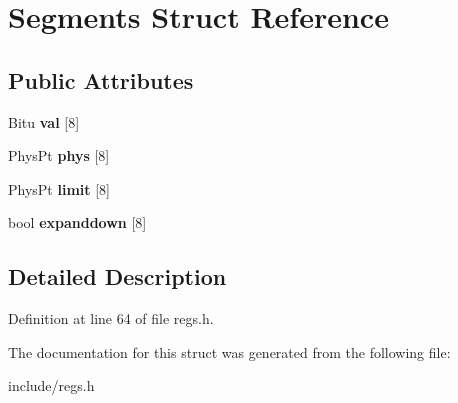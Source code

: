 \hypertarget{structSegments}{\section{Segments Struct Reference}
\label{structSegments}
}
\subsection*{Public Attributes}
\begin{DoxyCompactItemize}
\item 
\hypertarget{structSegments_ab09329dfeada62a00b45de6c73fbc6b9}{Bitu {\bfseries val} \mbox{[}8\mbox{]}}\label{structSegments_ab09329dfeada62a00b45de6c73fbc6b9}

\item 
\hypertarget{structSegments_a4f46d33e4b39db4d90dc08f60977827f}{Phys\-Pt {\bfseries phys} \mbox{[}8\mbox{]}}\label{structSegments_a4f46d33e4b39db4d90dc08f60977827f}

\item 
\hypertarget{structSegments_ade01cae0e4924f3e935edf9b85e5871c}{Phys\-Pt {\bfseries limit} \mbox{[}8\mbox{]}}\label{structSegments_ade01cae0e4924f3e935edf9b85e5871c}

\item 
\hypertarget{structSegments_ab1911ac9e65d10c97daebad5e709a6d2}{bool {\bfseries expanddown} \mbox{[}8\mbox{]}}\label{structSegments_ab1911ac9e65d10c97daebad5e709a6d2}

\end{DoxyCompactItemize}


\subsection{Detailed Description}


Definition at line 64 of file regs.\-h.



The documentation for this struct was generated from the following file\-:\begin{DoxyCompactItemize}
\item 
include/regs.\-h\end{DoxyCompactItemize}
